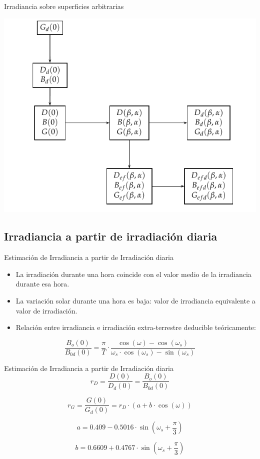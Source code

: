 \documentclass[xcolor={usenames,svgnames,dvipsnames}]{beamer}
\begin{document}
\begin{frame}[label={sec:org0a396f8}]{Irradiancia sobre superficies arbitrarias}
\begin{center}
\includegraphics[width=.9\linewidth]{../figs/ProcedimientoCalculoRadiacionInclinada.pdf}
\end{center}
\end{frame}

\subsection{Irradiancia a partir de irradiación diaria}
\label{sec:org856988c}

\begin{frame}[label={sec:orgde0b038}]{Estimación de Irradiancia a partir de Irradiación diaria}
\begin{itemize}
\item La irradiación durante una hora coincide con el valor medio de la irradiancia durante esa hora.

\item La variación solar durante una hora es baja: valor de irradiancia equivalente a valor de irradiación.

\item Relación entre irradiancia e irradiación extra-terrestre deducible teóricamente:
\end{itemize}

\[\frac{B_{o}(0)}{B_{0d}(0)}=\frac{\pi}{T}\cdot\frac{\cos(\omega)-\cos(\omega_{s})}{\omega_{s}\cdot\cos(\omega_{s})-\sin(\omega_{s})}\]
\end{frame}

\begin{frame}[label={sec:org764b461}]{Estimación de Irradiancia a partir de Irradiación diaria}
\[r_{D}=\frac{D(0)}{D_{d}(0)}=\frac{B_{o}(0)}{B_{0d}(0)}\]

\[r_{G}=\frac{G(0)}{G_{d}(0)}=r_{D}\cdot\left(a+b\cdot\cos(\omega)\right)\]

\[a=0.409-0.5016\cdot\sin(\omega_{s}+\frac{\pi}{3})\]

\[b=0.6609+0.4767\cdot\sin(\omega_{s}+\frac{\pi}{3})\]
\end{frame}
\end{document}
